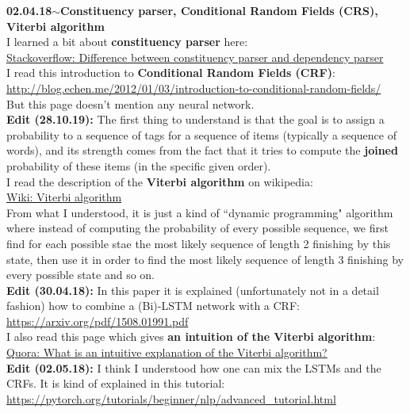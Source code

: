 \documentclass[11pt,a4paper]{article}
\newenvironment{loggentry}[2]%
{\noindent\textbf{#1}\hspace{1cm}$\mathbf{\sim}$\text{ }\textbf{#2}\\}{\vspace{0.5cm}}
\begin{document}
\begin{loggentry}{02.04.18}{Constituency parser, Conditional Random Fields (CRS), Viterbi algorithm}
I learned a bit about \textbf{constituency parser} here:\\
\href{https://stackoverflow.com/questions/10401076/difference-between-constituency-parser-and-dependency-parser}{Stackoverflow: Difference between constituency parser and dependency parser}\\
I read this introduction to \textbf{Conditional Random Fields (CRF)}:\\
\url{http://blog.echen.me/2012/01/03/introduction-to-conditional-random-fields/}\\
But this page doesn't mention any neural network.\\
\textbf{Edit (28.10.19):} The first thing to understand is that the goal is to assign a probability to a sequence of tags for a sequence of items (typically a sequence of words), and its strength comes from the fact that it tries to compute the \textbf{joined} probability of these items (in the specific given order).\\
I read the description of the \textbf{Viterbi algorithm} on wikipedia:\\
\href{https://en.wikipedia.org/wiki/Viterbi_algorithm}{Wiki: Viterbi algorithm}\\
From what I understood, it is just a kind of ``dynamic programming" algorithm where instead of computing the probability of every possible sequence, we first find for each possible stae the most likely sequence of length 2 finishing by this state, then use it in order to find the most likely sequence of length 3 finishing by every possible state and so on.\\
\textbf{Edit (30.04.18):} In this paper it is explained (unfortunately not in a detail fashion) how to combine a (Bi)-LSTM network with a CRF:\\
\url{https://arxiv.org/pdf/1508.01991.pdf}\\
I also read this page which gives \textbf{an intuition of the Viterbi algorithm}:\\
\href{https://www.quora.com/What-is-an-intuitive-explanation-of-the-Viterbi-algorithm}{Quora: What is an intuitive explanation of the Viterbi algorithm?}\\
\textbf{Edit (02.05.18):} I think I understood how one can mix the LSTMs and the CRFs. It is kind of explained in this tutorial:\\
\url{https://pytorch.org/tutorials/beginner/nlp/advanced_tutorial.html}\\

\end{loggentry}
\end{document}
